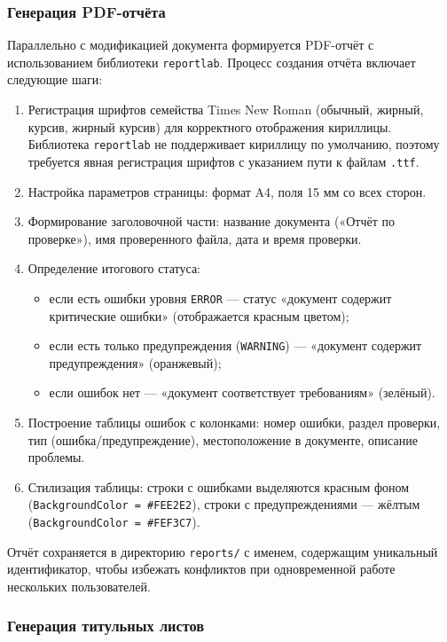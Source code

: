 \subsubsection{Генерация PDF-отчёта}

Параллельно с модификацией документа формируется PDF-отчёт с использованием библиотеки \texttt{reportlab}. Процесс создания отчёта включает следующие шаги:

\begin{enumerate}
	\item Регистрация шрифтов семейства Times New Roman (обычный, жирный, курсив, жирный курсив) для корректного отображения кириллицы. Библиотека \texttt{reportlab} не поддерживает кириллицу по умолчанию, поэтому требуется явная регистрация шрифтов с указанием пути к файлам \texttt{.ttf}.
	\item Настройка параметров страницы: формат A4, поля 15 мм со всех сторон.
	\item Формирование заголовочной части: название документа («Отчёт по проверке»), имя проверенного файла, дата и время проверки.
	\item Определение итогового статуса:
	\begin{itemize}
		\item если есть ошибки уровня \texttt{ERROR} — статус «документ содержит критические ошибки» (отображается красным цветом);
		\item если есть только предупреждения (\texttt{WARNING}) — «документ содержит предупреждения» (оранжевый);
		\item если ошибок нет — «документ соответствует требованиям» (зелёный).
	\end{itemize}
	\item Построение таблицы ошибок с колонками: номер ошибки, раздел проверки, тип (ошибка/предупреждение), местоположение в документе, описание проблемы.
	\item Стилизация таблицы: строки с ошибками выделяются красным фоном (\texttt{BackgroundColor = \#FEE2E2}), строки с предупреждениями — жёлтым (\texttt{BackgroundColor = \#FEF3C7}).
\end{enumerate}

Отчёт сохраняется в директорию \texttt{reports/} с именем, содержащим уникальный идентификатор, чтобы избежать конфликтов при одновременной работе нескольких пользователей.

\subsubsection{Генерация титульных листов}

